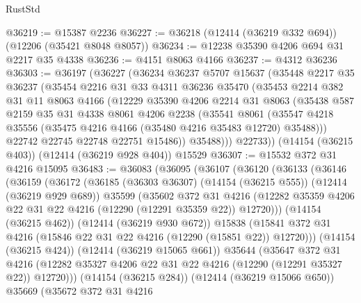 \begin{lexlean}{RustStd}
\begin{coremodule}
@36219 := @15387 @2236
@36227 := @36218 (@12414 (@36219 @332 @694)) (@12206 (@35421 @8048 @8057))
@36234 := @12238 @35390 @4206 @694 @31 @2217 @35 @4338
@36236 := @4151 @8063 @4166
@36237 := @4312 @36236
@36303 := @36197
    (@36227
      (@36234
        @36237
        @5707
        @15637
        (@35448
          @2217
          @35
          @36237
          (@35454
            @2216
            @31
            @33
            @4311
            @36236
            @35470
            (@35453
              @2214
              @382
              @31
              @11
              @8063
              @4166
              (@12229
                @35390
                @4206
                @2214
                @31
                @8063
                (@35438
                  @587
                  @2159
                  @35
                  @31
                  @4338
                  @8061
                  @4206
                  @2238
                  (@35541
                    @8061
                    (@35547 @4218 @35556 (@35475 @4216 @4166 (@35480 @4216 @35483 @12720) @35488)))
                  @22742
                  @22745
                  @22748
                  @22751
                  @15486))
              @35488)))
        @22733))
    (@14154 (@36215 @403))
    (@12414 (@36219 @928 @404))
    @15529
@36307 := @15532 @372 @31 @4216 @15095
@36483 := @36083
    (@36095
      (@36107
        (@36120
          (@36133
            (@36146
              (@36159
                (@36172
                  (@36185
                    (@36303 @36307)
                    (@14154 (@36215 @555))
                    (@12414 (@36219 @929 @689))
                    @35599
                    (@35602
                      @372
                      @31
                      @4216
                      (@12282 @35359 @4206 @22 @31 @22 @4216 (@12290 (@12291 @35359 @22)) @12720)))
                  (@14154 (@36215 @462))
                  (@12414 (@36219 @930 @672))
                  @15838
                  (@15841 @372 @31 @4216 (@15846 @22 @31 @22 @4216 (@12290 (@15851 @22)) @12720)))
                (@14154 (@36215 @424))
                (@12414 (@36219 @15065 @661))
                @35644
                (@35647
                  @372
                  @31
                  @4216
                  (@12282 @35327 @4206 @22 @31 @22 @4216 (@12290 (@12291 @35327 @22)) @12720)))
              (@14154 (@36215 @284))
              (@12414 (@36219 @15066 @650))
              @35669
              (@35672
                @372
                @31
                @4216

\end{coremodule}
\end{lexlean}
